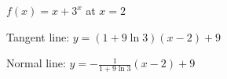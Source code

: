 {$f(x)=x+3^x$ at $x=2$
}
{Tangent line: $y = (1+9\ln 3)(x-2) + 9$

Normal line: $y = -\frac{1}{1+9\ln 3}(x-2) + 9$
}
